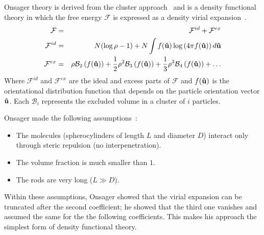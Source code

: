 Onsager theory is derived from the cluster approach~\cite{greenBook} and is a density functional theory 
in which the free energy $\mathcal{F}$ is expressed as a density virial expansion~\cite{PadillaVelasco97}.
\begin{eqnarray}
	\mathcal{F} &=& \mathcal{F}^{id} + \mathcal{F}^{ex}	\\
	\mathcal{F}^{id} &=& N(\log\rho - 1) + N \int f(\mathbf{\hat{u} })\log\left( 4\pi f(\mathbf{\hat{u} }) \right) d\mathbf{\hat{u} } \\
	\mathcal{F}^{ex} &=& \rho\mathcal{B}_2 \left( f(\mathbf{\hat{u} }) \right)
			+ \frac{1}{2}\rho^{2}\mathcal{B}_3 \left( f(\mathbf{\hat{u} }) \right)
			+ \frac{1}{3}\rho^{3}\mathcal{B}_4 \left( f(\mathbf{\hat{u} }) \right)
			+ \ldots	\label{exess_F}
\end{eqnarray}
%
Where $\mathcal{F}^{id} $ and $\mathcal{F}^{ex} $ are the ideal and excess parts of $\mathcal{F}$ and
$f(\mathbf{\hat{u} }) $ is the orientational distribution function that depends on the particle orientation
vector $\mathbf{\hat{u} }$. Each $\mathcal{B}_i$ represents the excluded volume in a cluster of $i$ 
particles.

Onsager made the following assumptions~:
\begin{itemize}
	\item The molecules (spherocylinders of length $L$ and diameter $D$) interact only through steric
	repulsion (no interpenetration).
	\item The volume fraction is much smaller than $1$.
	\item The rods are very long ($L \gg D$).
\end{itemize}

Within these assumptions, Onsager showed that the virial expansion can be truncated after the second
coefficient; he showed that the third one vanishes and assumed the same for the the following
coefficients. This makes his approach the simplest form of density functional theory.

